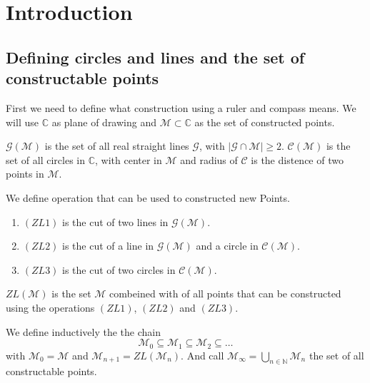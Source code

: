 \chapter{Introduction}

\section{Defining circles and lines and the set of constructable points}
First we need to define what construction using a ruler and compass means.
We will use $\mathbb{C}$ as plane of drawing and $\mathcal{M} \subset \mathbb{C}$ as the set of constructed points.


\begin{definition}
    $\mathcal{G(M)}$ is the set of all real straight lines $\mathcal{G}$, with $| \mathcal{G} \cap \mathcal{M} |\ge 2$.\newline
    $\mathcal{C(M)}$ is the set of all circles in $\mathbb{C}$, with center in $\mathcal{M}$ and radius of $\mathcal{C}$ is the distence of two points in $\mathcal{M}$.
\end{definition}

\begin{definition}
    We define operation that can be used to constructed new Points.
    \begin{enumerate}
        \item $(ZL 1)$ is the cut of two lines in $\mathcal{G(M)}$.
        \item $(ZL 2)$ is the cut of a line in $\mathcal{G(M)}$ and a circle in $\mathcal{C(M)}$.
        \item $(ZL 3)$ is the cut of two circles in $\mathcal{C(M)}$.
    \end{enumerate}
    $ZL(\mathcal{M})$ is the set $\mathcal{M}$ combeined with of all points that can be constructed using the operations $(ZL 1)$, $(ZL 2)$ and $(ZL 3)$.
\end{definition}

\begin{definition}
    We define inductively the the chain
    \begin{equation*}
        \mathcal{M}_0 \subseteq \mathcal{M}_1 \subseteq \mathcal{M}_2 \subseteq \dots
    \end{equation*}
    with $\mathcal{M}_0 = \mathcal{M}$ and $\mathcal{M}_{n+1} = ZL(\mathcal{M}_n)$.\newline
    And call $\mathcal{M}_{\infty} = \bigcup_{n \in \mathbb{N}} \mathcal{M}_n$ the set of all constructable points.
\end{definition}

